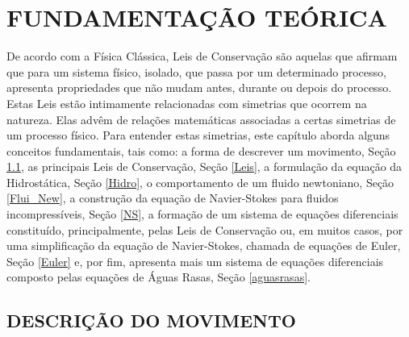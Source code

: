 \chapter{FUNDAMENTAÇÃO TEÓRICA}

De acordo com a Física Clássica, Leis de Conservação são aquelas que afirmam que para um sistema físico, isolado, que passa por um determinado processo, apresenta propriedades que não mudam antes, durante ou depois do processo. Estas Leis estão intimamente relacionadas com simetrias que ocorrem na natureza. Elas advêm de relações matemáticas associadas a certas simetrias de um processo físico. Para entender estas simetrias, este capítulo aborda alguns conceitos fundamentais, tais como: a forma de descrever um movimento, Seção \ref{Desc_Mov}, as principais Leis de Conservação, Seção \ref{Leis}, a formulação da equação da Hidrostática, Seção \ref{Hidro}, o comportamento de um fluido newtoniano, Seção \ref{Flui_New}, a construção da equação de Navier-Stokes para fluidos incompressíveis, Seção \ref{NS}, a formação de um sistema de equações diferenciais constituído, principalmente, pelas Leis de Conservação ou, em muitos casos, por uma simplificação da equação de Navier-Stokes, chamada de equações de Euler, Seção \ref{Euler}  e, por fim, apresenta mais um sistema de equações diferenciais composto pelas equações de Águas Rasas, Seção \ref{aguasrasas}.


\section{DESCRIÇÃO DO MOVIMENTO} \label{Desc_Mov}

